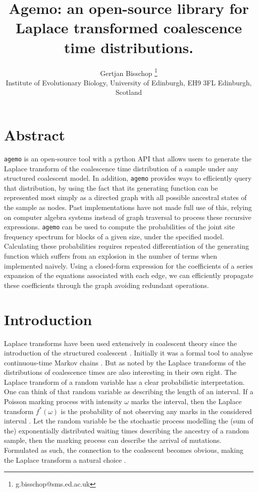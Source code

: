 \documentclass[10pt, a4]{article}
\title{Agemo: an open-source library for Laplace transformed coalescence time distributions.}
\author{Gertjan Bisschop \thanks{g.bisschop@sms.ed.ac.uk} \\ Institute of Evolutionary Biology, University of Edinburgh, EH9 3FL Edinburgh, Scotland}
\date{}
\begin{document}
\maketitle

\section*{Abstract}
\texttt{agemo} is an open-source tool with a python API that allows users to generate the Laplace transform of the coalescence time distribution of a sample under any structured coalescent model. In addition, \texttt{agemo} provides ways to efficiently query that distribution, by using the fact that its generating function can be represented most simply as a directed graph with all possible ancestral states of the sample as nodes. Past implementations have not made full use of this, relying on computer algebra systems instead of graph traversal to process these recursive expressions.
\texttt{agemo} can be used to compute the probabilities of the joint site frequency spectrum for blocks of a given size, under the specified model. Calculating these probabilities requires repeated differentiation of the generating function which suffers from an explosion in the number of terms when implemented naively. Using a closed-form expression for the coefficients of a series expansion of the equations associated with each edge, we can efficiently propagate these coefficients through the graph avoiding redundant operations.

\vspace{0.25cm} 
\linenumbers

\section{Introduction}

Laplace transforms have been used extensively in coalescent theory since the introduction of the structured coalescent \citep{Takahata1988, Notohara1990, Barton1995}. Initially it was a formal tool to analyse continuous-time Markov chains \citep{Takahata1988, Griffiths1991, Wilkinson-herbots1998}. But as noted by \citet{Wilkinson-herbots1998} the Laplace transforms of the distributions of coalescence times are also interesting in their own right. The Laplace transform of a random variable has a clear probabilistic interpretation. One can think of that random variable as describing the length of an interval. If a Poisson marking process with intensity $\omega$ marks the interval, then the Laplace transform $f^*(\omega)$ is the probability of not observing any marks in the considered interval \citep{Rade1972}. Let the random variable be the stochastic process modelling the (sum of the) exponentially distributed waiting times describing the ancestry of a random sample, then the marking process can describe the arrival of mutations. Formulated as such, the connection to the coalescent \citep{Kingman1982, Hudson1983, Tajima1983} becomes obvious, making the Laplace transform a natural choice \citep{Weissman2017}.
\end{document}
